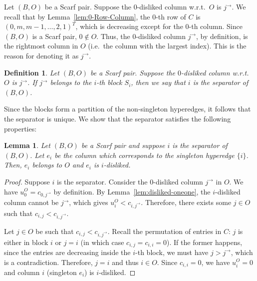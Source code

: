\documentclass[11pt]{article}
\newtheorem{lemma}[theorem]{Lemma}
\newtheorem{definition}[theorem]{Definition}
\begin{document}
Let $(B,O)$ be a Scarf pair. Suppose the $0$-disliked column w.r.t.~$O$ is $j^\rightarrow$. We recall that by Lemma~\ref{lem:0-Row-Column}, the $0$-th row of $C$ is $(0,m,m-1,\dots,2,1)^T$, which is decreasing except for the $0$-th column. Since $(B,O)$ is a Scarf pair, $0\notin O$. Thus, the $0$-disliked column $j^\rightarrow$, by definition, is the rightmost column in $O$ (i.e.~the column with the largest index). This is the reason for denoting it as $j^{\rightarrow}$. 



\begin{definition}\label{def:Separator}
    Let $(B,O)$ be a Scarf pair. Suppose the $0$-disliked column w.r.t.~$O$ is $j^\rightarrow$. If $j^\rightarrow$ belongs to the $i$-th block $S_i$, then we say that $i$ is the \emph{separator} of $(B,O)$.
\end{definition}

Since the blocks form a partition of the non-singleton hyperedges, it follows that the separator is unique. We show that the separator satisfies the following properties:

\begin{lemma}\label{lem:Separator-singleton}
    Let $(B,O)$ be a Scarf pair and suppose $i$ is the separator of $(B,O)$. Let $e_i$ be the column which corresponds to the singleton hyperedge $\{i\}$. Then, $e_i$ belongs to $O$ and $e_i$ is $i$-disliked.
\end{lemma}

\begin{proof}
Suppose $i$ is the separator. Consider the $0$-disliked column $j^\rightarrow$ in $O$. We have $u^O_0=c_{0,j^\rightarrow}$ by definition. By Lemma~\ref{lem:disliked-oneone}, the $i$-disliked column cannot be $j^\rightarrow$, which gives $u^O_i<c_{i,j^\rightarrow}$. Therefore, there exists some $j\in O$ such that $c_{i,j}<c_{i,j^\rightarrow}$.

Let $j\in O$ be such that $c_{i,j}<c_{i,j^\rightarrow}$. Recall the permutation of entries in $C$: $j$ is either in block $i$ or $j=i$ (in which case $c_{i,j}=c_{i,i}=0$). If the former happens, since the entries are decreasing inside the $i$-th block, we must have $j>j^\rightarrow$, which is a contradiction. Therefore, $j=i$ and thus $i\in O$. Since $c_{i,i}=0$, we have $u^O_i=0$ and column $i$ (singleton $e_i$) is $i$-disliked.
\end{proof}
\end{document}
